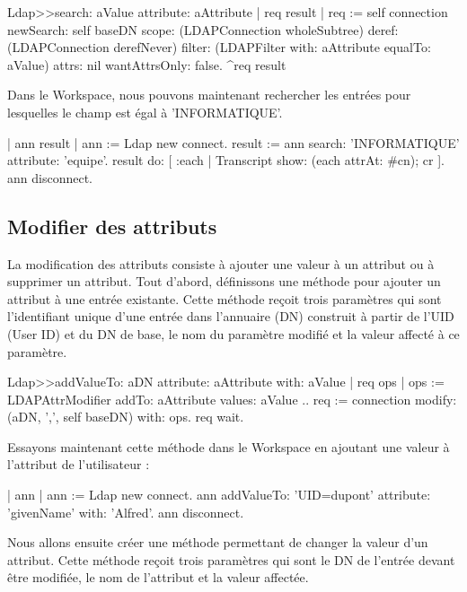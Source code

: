 \documentclass[a4paper,10pt,twoside]{book}
\begin{document}
\begin{code}{}
Ldap>>search: aValue attribute: aAttribute 
	| req result |
	req := self connection 
		newSearch: self baseDN 
		scope: (LDAPConnection wholeSubtree) 
		deref: (LDAPConnection derefNever) 
		filter: (LDAPFilter with: aAttribute equalTo: aValue) 
		attrs: nil 
		wantAttrsOnly: false.
	^req result
\end{code}


Dans le Workspace, nous pouvons maintenant rechercher les entr\'ees pour lesquelles le champ  est \'egal \`a 'INFORMATIQUE'.

\begin{code}{}
	| ann result |
	ann := Ldap new connect. 
	result := ann search: 'INFORMATIQUE' attribute: 'equipe'. 
	result do: [ :each |
		Transcript show: (each attrAt: #cn); cr ]. 
	ann disconnect.
\end{code}

\subsection{Modifier des attributs}

La modification des attributs consiste \`a ajouter une valeur \`a un attribut ou \`a supprimer un attribut. Tout d'abord, d\'efinissons une m\'ethode pour ajouter un attribut \`a une entr\'ee existante. Cette m\'ethode re\c coit trois param\`etres qui sont l'identifiant unique d'une entr\'ee dans l'annuaire (DN) construit \`a partir de l'UID (User ID) et du DN de base, le nom du param\`etre modifi\'e et la valeur affect\'e \`a ce param\`etre.

\begin{code}{}
Ldap>>addValueTo: aDN attribute: aAttribute with: aValue 
	| req ops |
	ops := { LDAPAttrModifier addTo: aAttribute values: { aValue }.}.
	req := connection modify: (aDN, ',', self baseDN) with: ops. req wait.
\end{code}

Essayons maintenant cette m\'ethode dans le Workspace en ajoutant une valeur \`a l'attribut  de l'utilisateur  :

\begin{code}{}
	| ann | 
	ann := Ldap new connect. 
	ann addValueTo: 'UID=dupont' attribute: 'givenName' with: 'Alfred'. 
	ann disconnect.
\end{code}

Nous allons ensuite cr\'eer une m\'ethode permettant de changer la valeur d'un attribut. Cette m\'ethode re\c coit trois param\`etres qui sont le DN de l'entr\'ee devant \^etre modifi\'ee, le nom de l'attribut et la valeur affect\'ee.
\end{document}
